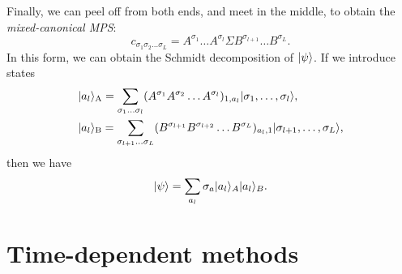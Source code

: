 \documentclass{article}
\begin{document}
Finally, we can peel off from both ends, and meet in the middle, to obtain the \textit{mixed-canonical MPS}:
\begin{equation}
    c_{\sigma_1\sigma_2\dots\sigma_L}=A^{\sigma_1}\dots A^{\sigma_l}\Sigma B^{\sigma_{l+1}}\dots B^{\sigma_L}.
\end{equation}
In this form, we can obtain the Schmidt decomposition of $|\psi\rangle$. If we introduce states
\begin{align}
    &|a_l\rangle_{\mathrm{A}}=\sum_{\sigma_1\dots\sigma_l}(A^{\sigma_1}A^{\sigma_2}\dots A^{\sigma_l})_{1,a_l}|\sigma_1,\dots,\sigma_l\rangle,\\
    &|a_l\rangle_{\mathrm{B}}=\sum_{\sigma_{l+1}\dots\sigma_L}(B^{\sigma_{l+1}}B^{\sigma_{l+2}}\dots B^{\sigma_L})_{a_l,1}|\sigma_{l+1},\dots,\sigma_L\rangle,
\end{align}
then we have
\begin{equation}
    |\psi\rangle=\sum_{a_l}\sigma_a|a_l\rangle_A|a_l\rangle_B.
\end{equation}

\section{Time-dependent methods}
\end{document}

